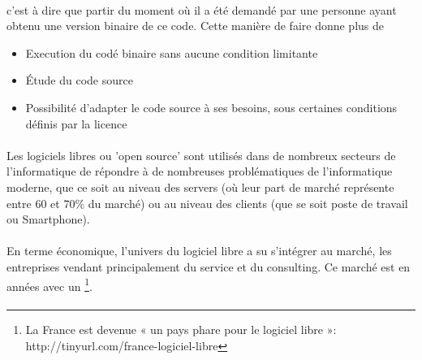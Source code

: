 \paragraph{}
c'est à dire que%
partir du moment où il a été demandé par une personne ayant obtenu
une version binaire de ce code. Cette manière de faire donne plus de

\begin{itemize}

  \item {Execution du codé binaire sans aucune condition limitante}

  \item {Étude du code source}

  \item {Possibilité d'adapter le code source à ses besoins, sous
  certaines
    conditions définis par la licence}

\end{itemize}

\paragraph {}

Les logiciels libres ou 'open source' sont utilisés dans de nombreux
secteurs de l'informatique %
de répondre à de nombreuses problématiques de l'informatique moderne,
que ce soit au niveau des servers (où leur part de marché représente
entre 60 et 70\% du marché) ou au niveau des clients (que se soit
poste de travail ou Smartphone).

\paragraph {}

En terme économique, l'univers du logiciel libre a su s'intégrer
au marché, les entreprises vendant principalement du service et du
consulting. Ce marché est en %
années avec un %
\footnote{La France est devenue « un pays phare pour le logiciel libre
»: http://tinyurl.com/france-logiciel-libre}.

\paragraph{}

